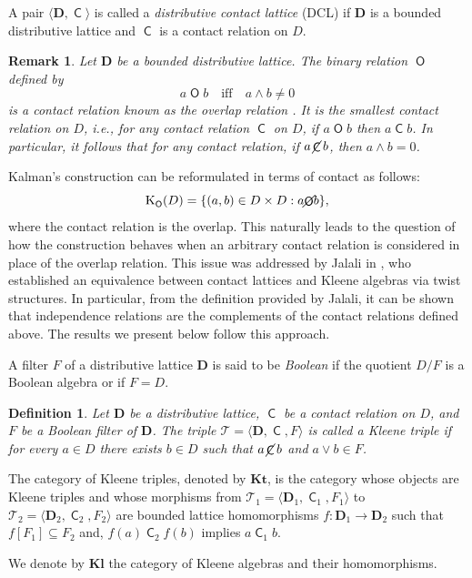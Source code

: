\documentclass{article}
\newtheorem{remark}[theorem]{Remark}
\newtheorem{definition}[theorem]{Definition}
\DeclareMathOperator{\con}{\mathsf{C}}
\DeclareMathOperator{\notcon}{\cancel{ \con}}
\DeclareMathOperator{\Overl}{\mathsf{O}}
\newcommand{\KO}[1]{\mathrm{K}_{\Overl}(#1)}
\newcommand{\D}{\mathbf{D}}
\newcommand{\T}{\mathcal{T}}
\begin{document}
A pair $\langle \D, \con \rangle$ is called a \emph{distributive contact lattice} (DCL) if $\D$ is a bounded distributive lattice and $\con$ is a contact relation on $D$.

\begin{remark}\label{rem:overlap}
    Let $\D$ be a bounded distributive lattice. The binary relation $\Overl$ defined by
    \[
    a \Overl b \quad \text{iff} \quad a \wedge b \neq 0
    \]
    is a contact relation known as the \emph{overlap relation} \cite{duntsch2008distributive}. It is the smallest contact relation on $D$, i.e., for any contact relation $\con$ on $D$, if $a \Overl b$ then $a \con b$. In particular, it follows that for any contact relation, if $a \notcon b$, then $a \wedge b = 0$. 
\end{remark}

Kalman's construction can be reformulated in terms of contact as follows:
\[
\KO{D} = \{(a, b) \in D \times D : a \cancel{\Overl} b \},
\]
where the contact relation is the overlap. This naturally leads to the question of how the construction behaves when an arbitrary contact relation is considered in place of the overlap relation. This issue was addressed by Jalali in \cite{jalali}, who established an equivalence between contact lattices and Kleene algebras via twist structures. In particular, from the definition provided by Jalali, it can be shown that independence relations are the complements of the contact relations defined above. The results we present below follow this approach.

A filter $F$ of a distributive lattice $\D$ is said to be \emph{Boolean} if the quotient $D/F$ is a Boolean algebra or if $F=D$.

\begin{definition}
    Let $ \D$ be a distributive lattice, $ \con$ be a contact relation on $D$, and $ F$ be a Boolean filter of $ \D$. The triple $ \T=\langle \D, \con, F \rangle$ is called a \emph{Kleene triple} if for every $ a \in D$ there exists $ b \in D$ such that $ a\notcon b$ and $ a \vee b \in F$.
\end{definition}

The category of Kleene triples, denoted by $ \mathbf{Kt}$, is the category whose objects are Kleene triples and whose morphisms from
$\T_1=\langle\D_1,\con_1,F_1\rangle$ to $\T_2=\langle\D_2,\con_2,F_2\rangle$ are bounded lattice homomorphisms $f\colon \D_1\to \D_2$ such that $ f[F_1] \subseteq F_2$ and, $f(a)\con_2 f(b)$ implies $a\con_1 b$.

We denote by $\mathbf{Kl}$ the category of Kleene algebras and their homomorphisms.
\end{document}
